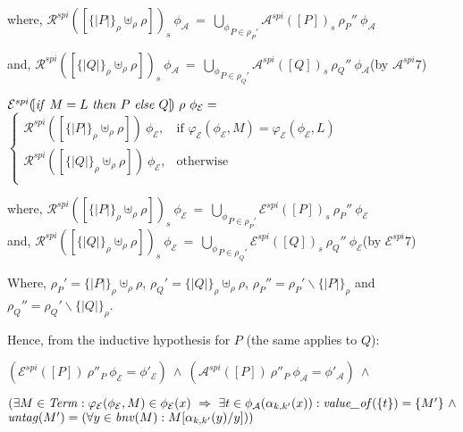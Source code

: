 \documentclass[10pt,a4paper,final,oneside,fleqn]{book}
\begin{document}
\noindent
where, ${\mathcal R}^{spi}(\![\{\!|P|\!\}_\rho\uplus_\rho\rho]\!)_s~\phi_\mathcal{A}~=~\underset{P\in\rho_P'}{\bigcup_\phi}\mathcal{A}^{spi}(\![P]\!)_s~\rho_P''~\phi_\mathcal{A}$

\noindent
and, ${\mathcal R}^{spi}(\![\{\!|Q|\!\}_\rho\uplus_\rho\rho]\!)_s~\phi_\mathcal{A}~=~\underset{P\in\rho_Q'}{\bigcup_\phi}\mathcal{A}^{spi}(\![Q]\!)_s~\rho_Q''~\phi_\mathcal{A}$\hfill(by $\mathcal{A}^{spi}7$)\vspace{5mm}

\noindent
$\mathcal{E}^{spi}(\![\mbox{{\itshape if\/} }M=L\mbox{ {\itshape then\/} }P\mbox{ {\itshape else\/} }Q]\!)~\rho~\phi_\mathcal{E}=$\\
$\left\{\begin{array}{ll}
\mathcal{R}^{spi}(\![\{\!|P|\!\}_\rho\uplus_\rho\rho]\!)~\phi_\mathcal{E},&\mbox{if }\varphi_\mathcal{E}(\phi_\mathcal{E},M)=\varphi_\mathcal{E}(\phi_\mathcal{E},L)\\
\mathcal{R}^{spi}(\![\{\!|Q|\!\}_\rho\uplus_\rho\rho]\!)~\phi_\mathcal{E},&\mbox{otherwise}\\
\end{array}\right.$\vspace{5mm}

\noindent
where, ${\mathcal R}^{spi}(\![\{\!|P|\!\}_\rho\uplus_\rho\rho]\!)_s~\phi_\mathcal{E}~=~\underset{P\in\rho_P'}{\bigcup_\phi}\mathcal{E}^{spi}(\![P]\!)_s~\rho_P''~\phi_\mathcal{E}$\\and, ${\mathcal R}^{spi}(\![\{\!|Q|\!\}_\rho\uplus_\rho\rho]\!)_s~\phi_\mathcal{E}~=~\underset{P\in\rho_Q'}{\bigcup_\phi}\mathcal{E}^{spi}(\![Q]\!)_s~\rho_Q''~\phi_\mathcal{E}$\hfill(by $\mathcal{E}^{spi}7$)

\noindent
Where, $\rho_P'=\{\!|P|\!\}_\rho\uplus_\rho\rho$, $\rho_Q'=\{\!|Q|\!\}_\rho\uplus_\rho\rho$, $\rho_P''=\rho_P'\backslash\{\!|P|\!\}_\rho$ and $\rho_Q''=\rho_Q'\backslash\{\!|Q|\!\}_\rho$.\vspace{5mm}

\noindent
Hence, from the inductive hypothesis for $P$ (the same applies to $Q$):

\noindent
$(\mathcal{E}^{spi}(\![P]\!)~\rho''_P~\phi_{\mathcal{E}}=\phi'_\mathcal{E})~\wedge~(\mathcal{A}^{spi}(\![P]\!)~\rho''_P~\phi_{\mathcal{A}}=\phi'_\mathcal{A})~\wedge~$

\noindent
$(\exists M\in\mbox{{\itshape Term\/}}:\varphi_\mathcal{E}(\phi_\mathcal{E},M)\in\phi_\mathcal{E}(x)~\Rightarrow~\exists t\in\phi_\mathcal{A}(\alpha_{k,k'}(x)):\mbox{{\itshape value\_of\/}}(\{t\})=\{M'\}~\wedge$\\
$\mbox{{\itshape untag\/}}(M')=(\forall y\in\mbox{{\itshape bnv\/}}(M):M[\alpha_{k,k'}(y)/y]))$\vspace{5mm}
\end{document}

